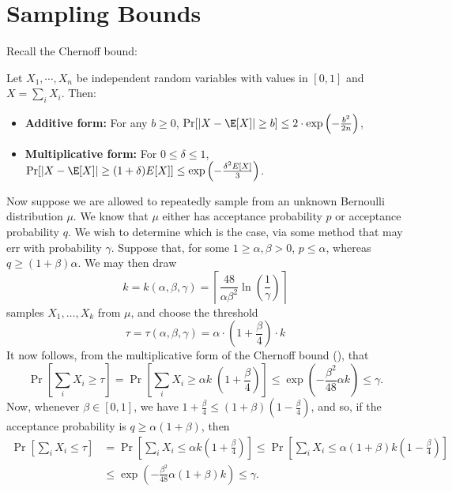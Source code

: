 \appendix

\section{Sampling Bounds}\label{sec:sampling}

Recall the Chernoff bound:


\begin{proposition}\label{lem:chernoff}
    Let $X_1, \cdots, X_n$ be independent random variables with values in $[0,1]$ and $X = \sum_i X_i$. Then: \begin{itemize}
        \item \textbf{Additive form: } For any $b \ge 0$, $\Pr[|X - \E[X]| \ge b] \le 2\cdot \exp\left(-\frac{b^2}{2n}\right)$, \label{itm:chernoff-add}

        \item \textbf{Multiplicative form: } For $0 \le \delta \le 1$, $\Pr[|X - \E[X]| \ge (1+\delta) E[X]] \le \exp\left(-\frac{\delta^2 E[X]}{3}\right)$.\label{itm:chernoff-mult}
    \end{itemize}
\end{proposition}

\bigskip\noindent
Now suppose we are allowed to repeatedly sample from an unknown Bernoulli distribution $\mu$. We know that $\mu$ either has acceptance probability $p$ or acceptance probability $q$. We wish to determine which is the case, via some method that may err with probability $\gamma$. Suppose that, for some $1 \ge \alpha,\beta > 0$, $p \le \alpha$, whereas $q \ge (1 + \beta) \alpha$. We may then draw 
\[
k = k(\alpha, \beta, \gamma) = \left\lceil\frac{48}{\alpha \beta^2} \ln\left(\frac{1}{\gamma}\right)\right\rceil
\]
samples $X_1, \ldots, X_k$ from $\mu$, and choose the threshold
\[
\tau = \tau(\alpha, \beta, \gamma) = \alpha \cdot \left(1 + \frac{\beta}{4}\right) \cdot k 
\]
It now follows, from the multiplicative form of the Chernoff bound (), that
\[
\Pr[\sum_i X_i \ge \tau] = \Pr[\sum_i X_i \ge \alpha k \;\left(1 + \frac\beta4\right)] \le \exp\left(- \frac{\beta^2}{48} \alpha k \right) \le \gamma.
\]
Now, whenever $\beta \in [0,1]$, we have $1 + \frac\beta4 \le (1 + \beta) ( 1 - \frac{\beta}{4})$, and so, if the acceptance probability is $q \ge \alpha(1 + \beta)$, then
\begin{align*}
\Pr[\sum_i X_i \le \tau] %
& = \Pr[\sum_i X_i \le \alpha k\left(1 + \frac\beta4\right)] \le \Pr[\sum_i X_i \le \alpha (1 + \beta) k\left(1 - \frac\beta4\right)] \\
& \le \exp\left(- \frac{\beta^2}{48} \alpha (1+\beta) k \right) \le \gamma.
\end{align*}





